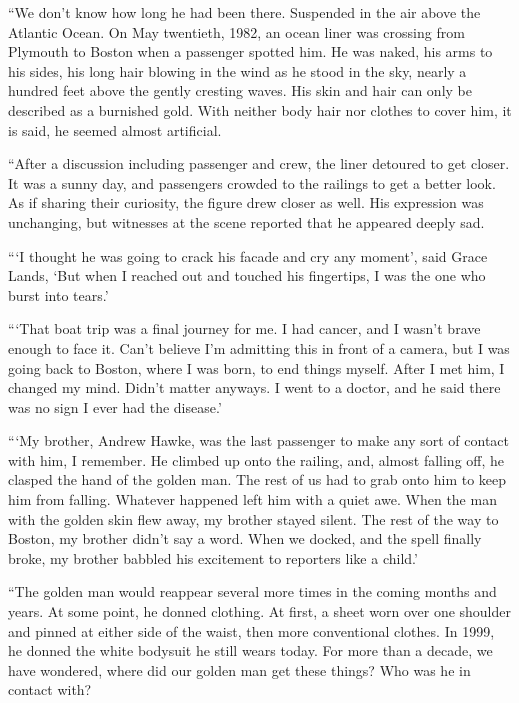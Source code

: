





``We don't know how long he had been there.  Suspended in the air above the Atlantic Ocean.  On May twentieth, 1982, an ocean liner was crossing from Plymouth to Boston when a passenger spotted him.  He was naked, his arms to his sides, his long hair blowing in the wind as he stood in the sky, nearly a hundred feet above the gently cresting waves.  His skin and hair can only be described as a burnished gold.  With neither body hair nor clothes to cover him, it is said, he seemed almost artificial.



``After a discussion including passenger and crew, the liner detoured to get closer.  It was a sunny day, and passengers crowded to the railings to get a better look.  As if sharing their curiosity, the figure drew closer as well.  His expression was unchanging, but witnesses at the scene reported that he appeared deeply sad.



```I thought he was going to crack his facade and cry any moment', said Grace Lands, `But when I reached out and touched his fingertips, I was the one who burst into tears.'



```That boat trip was a final journey for me.  I had cancer, and I wasn't brave enough to face it.  Can't believe I'm admitting this in front of a camera, but I was going back to Boston, where I was born, to end things myself.  After I met him, I changed my mind.  Didn't matter anyways.  I went to a doctor, and he said there was no sign I ever had the disease.'



```My brother, Andrew Hawke, was the last passenger to make any sort of contact with him, I remember.  He climbed up onto the railing, and, almost falling off, he clasped the hand of the golden man.  The rest of us had to grab onto him to keep him from falling.  Whatever happened left him with a quiet awe.  When the man with the golden skin flew away, my brother stayed silent.  The rest of the way to Boston, my brother didn't say a word.  When we docked, and the spell finally broke, my brother babbled his excitement to reporters like a child.'



``The golden man would reappear several more times in the coming months and years.  At some point, he donned clothing.  At first, a sheet worn over one shoulder and pinned at either side of the waist, then more conventional clothes.  In 1999, he donned the white bodysuit he still wears today.  For more than a decade, we have wondered, where did our golden man get these things?  Who was he in contact with?



